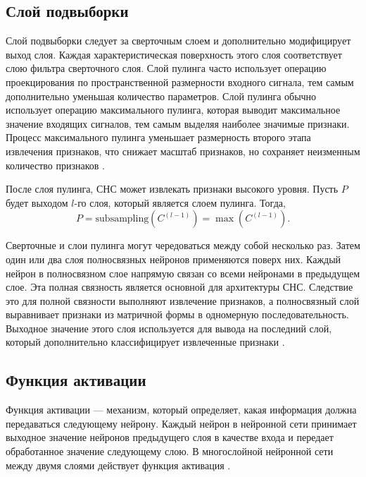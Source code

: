 \subsection{Слой подвыборки}
	Слой подвыборки следует за сверточным слоем и дополнительно модифицирует выход слоя. Каждая характеристическая поверхность этого слоя соответствует слою фильтра сверточного слоя. Слой пулинга часто использует операцию проекцирования по пространственной размерности входного сигнала, тем самым дополнительно уменьшая количество параметров. Слой пулинга обычно использует операцию максимального пулинга, которая выводит максимальное значение входящих сигналов, тем самым выделяя наиболее значимые признаки. Процесс максимального пулинга уменьшает размерность второго этапа извлечения признаков, что снижает масштаб признаков, но сохраняет неизменным количество признаков \cite{lightweight}.
	
	После слоя пулинга, СНС может извлекать признаки высокого уровня. Пусть \( P \) будет выходом \( l \)-го слоя, который является слоем пулинга. Тогда,
	\begin{equation}
		P = \text{subsampling}(C^{(l-1)}) = \max(C^{(l-1)}).
	\end{equation}
	
	Сверточные и слои пулинга могут чередоваться между собой несколько раз. Затем один или два слоя полносвязных нейронов применяются поверх них. Каждый нейрон в полносвязном слое напрямую связан со всеми нейронами в предыдущем слое. Эта полная связность является основной для архитектуры СНС. Следствие это для полной связности выполняют извлечение признаков, а полносвязный слой выравнивает признаки из матричной формы в одномерную последовательность. Выходное значение этого слоя используется для вывода на последний слой, который дополнительно классифицирует извлеченные признаки \cite{lightweight}.
	
\subsection{Функция активации}
	Функция активации --- механизм, который определяет, какая информация должна передаваться следующему нейрону. Каждый нейрон в нейронной сети принимает выходное значение нейронов предыдущего слоя в качестве входа и передает обработанное значение следующему слою. В многослойной нейронной сети между двумя слоями действует функция активация \cite{survey}.
	
	
